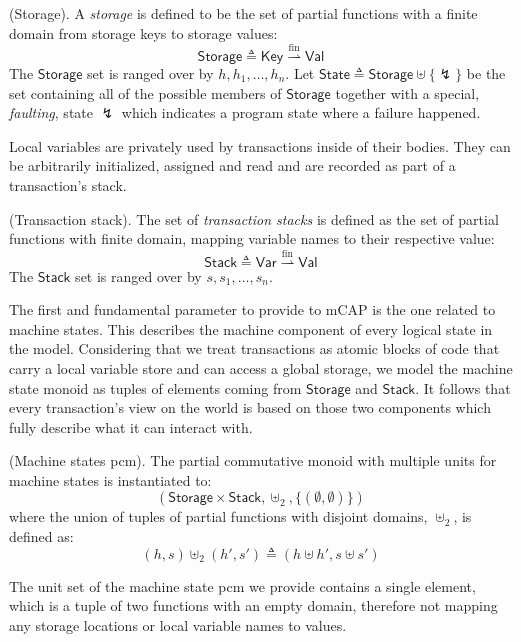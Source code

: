 \begin{defn}
	(Storage).
	A \emph{storage} is defined to be the set of partial functions with a finite domain from storage keys to storage values:
	\[
		\mathsf{Storage} \triangleq \mathsf{Key} \overset{\text{fin}}{\rightharpoonup} \mathsf{Val}
	\]
	The $\mathsf{Storage}$ set is ranged over by $h, h_1, \ldots, h_n$. Let $\mathsf{State} \triangleq \mathsf{Storage} \uplus \{\lightning\}$ be the set containing all of the possible members of $\mathsf{Storage}$ together with a special, \textit{faulting}, state $\lightning$ which indicates a program state where a failure happened.	
\end{defn}

Local variables are privately used by transactions inside of their bodies. They can be arbitrarily initialized, assigned and read and are recorded as part of a transaction's stack.
\begin{defn}
	(Transaction stack).
	The set of \emph{transaction stacks} is defined as the set of partial functions with finite domain, mapping variable names to their respective value:
	\[
		\mathsf{Stack} \triangleq \mathsf{Var} \overset{\text{fin}}{\rightharpoonup} \mathsf{Val}
	\]
	The $\mathsf{Stack}$ set is ranged over by $s, s_1, \ldots, s_n$.
\end{defn}

The first and fundamental parameter to provide to mCAP is the one related to machine states. This describes the machine component of every logical state in the model. Considering that we treat transactions as atomic blocks of code that carry a local variable store and can access a global storage, we model the machine state monoid as tuples of elements coming from $\mathsf{Storage}$ and $\mathsf{Stack}$. It follows that every transaction's view on the world is based on those two components which fully describe what it can interact with.
\begin{defn}
	(Machine states pcm).
	The partial commutative monoid with multiple units for machine states is instantiated to:
	\[
		(\mathsf{Storage} \times \mathsf{Stack}, \uplus_2, \{ (\emptyset, \emptyset) \})
	\]
	where the union of tuples of partial functions with disjoint domains, $\uplus_2$, is defined as:
	\[
		(h, s) \uplus_2 (h', s') \triangleq (h \uplus h', s \uplus s')
	\]
\end{defn}
The unit set of the machine state pcm we provide contains a single element, which is a tuple of two functions with an empty domain, therefore not mapping any storage locations or local variable names to values.

